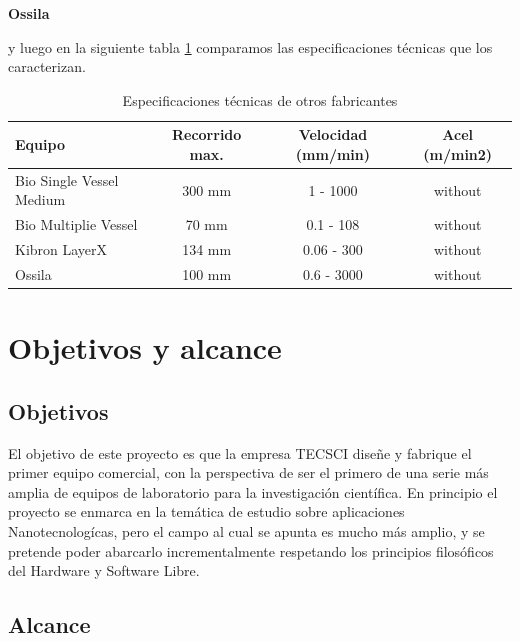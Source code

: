 \textbf{Ossila}  \citep{4_web_ossila}

y luego en la siguiente tabla \ref{tab:equipos_competencia} comparamos las especificaciones técnicas que los caracterizan.

\begin{table}[h]
	\centering
	\caption[caption corto]{Especificaciones técnicas de otros fabricantes}
	\begin{tabular}{l c c c}    
		\toprule
		\textbf{Equipo} 	 & \textbf{Recorrido max.}  & \textbf{Velocidad (mm/min)}  & \textbf{Acel (m/min2)}\\
		\midrule
		Bio Single Vessel Medium	& 300 mm 	& 1    - 1000   & without 		\\		
		Bio Multiplie Vessel		& 70  mm	& 0.1  - 108 	& without		\\
		Kibron LayerX				& 134 mm	& 0.06 - 300	& without		\\
		Ossila						& 100 mm	& 0.6 - 3000	& without		\\
		\bottomrule
		\hline
	\end{tabular}
	\label{tab:equipos_competencia}
\end{table}


\section{Objetivos y alcance}

\subsection{Objetivos}

El objetivo de este proyecto es que la empresa TECSCI diseñe y fabrique el primer equipo comercial, con la perspectiva de ser el primero de una serie más amplia de equipos de laboratorio para la investigación científica. En principio el proyecto se enmarca en la temática de estudio sobre aplicaciones  Nanotecnologícas, pero el campo al cual se apunta es mucho más amplio, y se pretende poder abarcarlo incrementalmente respetando los principios filosóficos del Hardware y Software Libre.


\subsection{Alcance}

